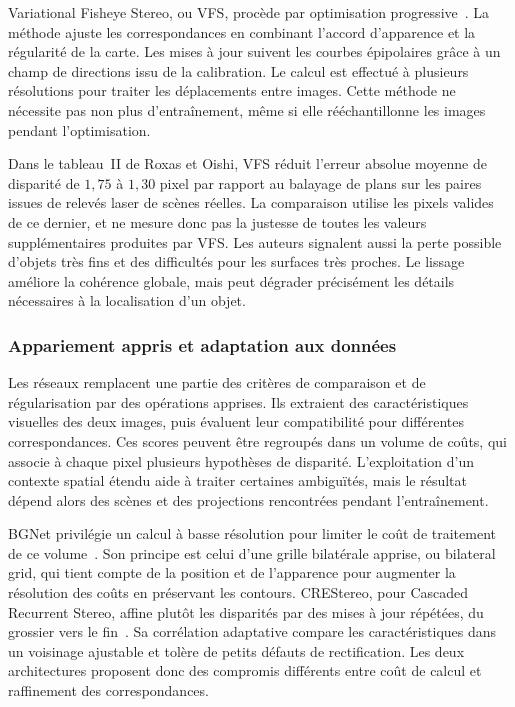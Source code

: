 \documentclass[11pt,a4paper]{article}
\begin{document}
Variational Fisheye Stereo, ou VFS, procède par optimisation progressive~\cite{roxas2020}. La méthode ajuste les correspondances en combinant l'accord d'apparence et la régularité de la carte. Les mises à jour suivent les courbes épipolaires grâce à un champ de directions issu de la calibration. Le calcul est effectué à plusieurs résolutions pour traiter les déplacements entre images. Cette méthode ne nécessite pas non plus d'entraînement, même si elle rééchantillonne les images pendant l'optimisation.

Dans le tableau~II de Roxas et Oishi, VFS réduit l'erreur absolue moyenne de disparité de $1{,}75$ à $1{,}30$ pixel par rapport au balayage de plans sur les paires issues de relevés laser de scènes réelles. La comparaison utilise les pixels valides de ce dernier, et ne mesure donc pas la justesse de toutes les valeurs supplémentaires produites par VFS. Les auteurs signalent aussi la perte possible d'objets très fins et des difficultés pour les surfaces très proches. Le lissage améliore la cohérence globale, mais peut dégrader précisément les détails nécessaires à la localisation d'un objet.

\subsubsection{Appariement appris et adaptation aux données}
Les réseaux remplacent une partie des critères de comparaison et de régularisation par des opérations apprises. Ils extraient des caractéristiques visuelles des deux images, puis évaluent leur compatibilité pour différentes correspondances. Ces scores peuvent être regroupés dans un volume de coûts, qui associe à chaque pixel plusieurs hypothèses de disparité. L'exploitation d'un contexte spatial étendu aide à traiter certaines ambiguïtés, mais le résultat dépend alors des scènes et des projections rencontrées pendant l'entraînement.

BGNet privilégie un calcul à basse résolution pour limiter le coût de traitement de ce volume~\cite{xu2021bgnet}. Son principe est celui d'une grille bilatérale apprise, ou bilateral grid, qui tient compte de la position et de l'apparence pour augmenter la résolution des coûts en préservant les contours. CREStereo, pour Cascaded Recurrent Stereo, affine plutôt les disparités par des mises à jour répétées, du grossier vers le fin~\cite{li2022crestereo}. Sa corrélation adaptative compare les caractéristiques dans un voisinage ajustable et tolère de petits défauts de rectification. Les deux architectures proposent donc des compromis différents entre coût de calcul et raffinement des correspondances.
\end{document}
